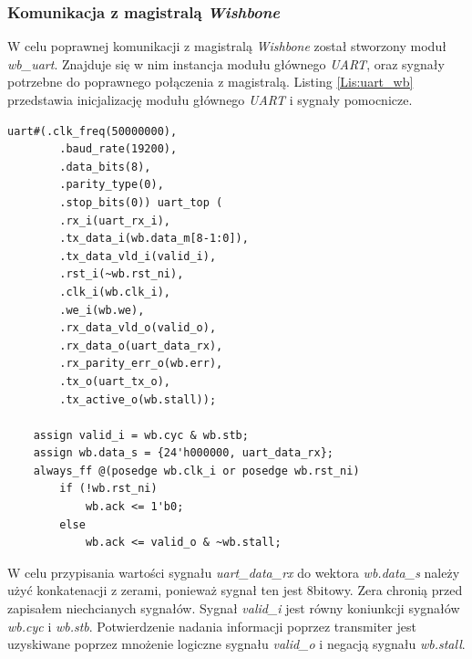 \documentclass[11pt,a4paper]{article}
\begin{document}
	\subsubsection{Komunikacja z magistralą \textit{Wishbone}}
		\hspace{5mm} W celu poprawnej komunikacji z magistralą \textit{Wishbone} został stworzony moduł \textit{wb\_uart}. Znajduje się w nim instancja modułu głównego \textit{UART}, oraz sygnały potrzebne do poprawnego połączenia z magistralą. Listing \ref{Lis:uart_wb} przedstawia inicjalizację modułu głównego \textit{UART} i sygnały pomocnicze.	\\	
\begin{minipage}{\textwidth}
\begin{scriptsize}
\begin{lstlisting}[label=Lis:uart_wb,caption=Model \textit{GPIO}]
	uart#(.clk_freq(50000000),
		.baud_rate(19200),
		.data_bits(8),
		.parity_type(0),
		.stop_bits(0)) uart_top (
		.rx_i(uart_rx_i),
		.tx_data_i(wb.data_m[8-1:0]),
		.tx_data_vld_i(valid_i),
		.rst_i(~wb.rst_ni),
		.clk_i(wb.clk_i),
		.we_i(wb.we),
		.rx_data_vld_o(valid_o),
		.rx_data_o(uart_data_rx),
		.rx_parity_err_o(wb.err),
		.tx_o(uart_tx_o),
		.tx_active_o(wb.stall));

	assign valid_i = wb.cyc & wb.stb;
	assign wb.data_s = {24'h000000, uart_data_rx};  
	always_ff @(posedge wb.clk_i or posedge wb.rst_ni)
		if (!wb.rst_ni)
			wb.ack <= 1'b0;
		else
			wb.ack <= valid_o & ~wb.stall;
\end{lstlisting}
\end{scriptsize}
\end{minipage}		
		W celu przypisania wartości sygnału \textit{uart\_data\_rx} do wektora \textit{wb.data\_s} należy użyć konkatenacji z zerami, ponieważ sygnał ten jest 8bitowy. Zera chronią przed zapisałem niechcianych sygnałów. Sygnał \textit{valid\_i} jest równy koniunkcji sygnałów \textit{wb.cyc} i \textit{wb.stb}. Potwierdzenie nadania informacji poprzez transmiter jest uzyskiwane poprzez mnożenie logiczne sygnału \textit{valid\_o} i negacją sygnału \textit{wb.stall}.
\end{document}
